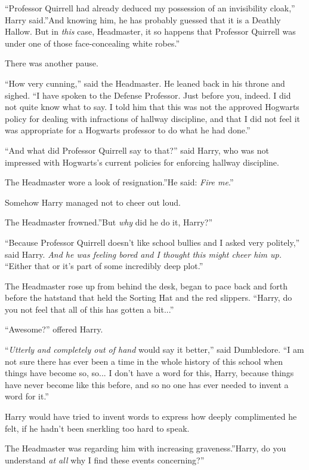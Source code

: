 ``Professor Quirrell had already deduced my possession of an
invisibility cloak,'' Harry said.''And knowing him, he has probably
guessed that it is a Deathly Hallow. But in \emph{this} case,
Headmaster, it so happens that Professor Quirrell was under one of those
face-concealing white robes.''

There was another pause.

``How very cunning,'' said the Headmaster. He leaned back in his throne
and sighed. ``I have spoken to the Defense Professor. Just before you,
indeed. I did not quite know what to say. I told him that this was not
the approved Hogwarts policy for dealing with infractions of hallway
discipline, and that I did not feel it was appropriate for a Hogwarts
professor to do what he had done.''

``And what did Professor Quirrell say to that?'' said Harry, who was not
impressed with Hogwarts's current policies for enforcing hallway
discipline.

The Headmaster wore a look of resignation.''He said: \emph{Fire me}.''

Somehow Harry managed not to cheer out loud.

The Headmaster frowned.''But \emph{why} did he do it, Harry?''

``Because Professor Quirrell doesn't like school bullies and I asked
very politely,'' said Harry. \emph{And he was feeling bored and I
thought this might cheer him up.} ``Either that or it's part of some
incredibly deep plot.''

The Headmaster rose up from behind the desk, began to pace back and
forth before the hatstand that held the Sorting Hat and the red
slippers. ``Harry, do you not feel that all of this has gotten a
bit...''

``Awesome?'' offered Harry.

``\emph{Utterly and completely out of hand} would say it better,'' said
Dumbledore. ``I am not sure there has ever been a time in the whole
history of this school when things have become so, so... I don't
have a word for this, Harry, because things have never become like this
before, and so no one has ever needed to invent a word for it.''

Harry would have tried to invent words to express how deeply
complimented he felt, if he hadn't been snerkling too hard to speak.

The Headmaster was regarding him with increasing graveness.''Harry, do
you understand \emph{at all} why I find these events concerning?''

